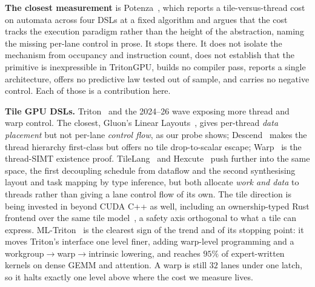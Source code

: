 \documentclass[sigplan,review,nonacm,10pt]{acmart}
\begin{document}
\textbf{The closest measurement} is Potenza~\cite{twofaces2026}, which reports a
tile-versus-thread cost on automata across four DSLs at a fixed algorithm and argues that
the cost tracks the execution paradigm rather than the height of the abstraction, naming
the missing per-lane control in prose. It stops there. It does not isolate the mechanism
from occupancy and instruction count, does not establish that the primitive is
inexpressible in TritonGPU, builds no compiler pass, reports a single architecture, offers
no predictive law tested out of sample, and carries no negative control. Each of those is a
contribution here.

\textbf{Tile GPU DSLs.} Triton~\cite{triton2019} and the 2024--26 wave exposing more
thread and warp control. The closest, Gluon's Linear Layouts~\cite{linearlayouts2025},
gives per-thread \emph{data placement} but not per-lane \emph{control flow}, as our probe
shows; Descend~\cite{descend2024} makes the thread hierarchy first-class but offers no tile
drop-to-scalar escape; Warp~\cite{warp2022} is the thread-SIMT existence proof. TileLang~\cite{tilelang2025} and Hexcute~\cite{hexcute2025} push further into the same
space, the first decoupling schedule from dataflow and the second synthesising layout and
task mapping by type inference, but both allocate \emph{work and data} to threads rather
than giving a lane control flow of its own. The tile direction is being invested in beyond
CUDA C++ as well, including an ownership-typed Rust frontend over the same tile
model~\cite{fearless2026}, a safety axis orthogonal to what a tile can express.
ML-Triton~\cite{mltriton2025} is the clearest sign of the trend and of its stopping point:
it moves Triton's interface one level finer, adding warp-level programming and a
workgroup$\rightarrow$warp$\rightarrow$intrinsic lowering, and reaches $95\%$ of
expert-written kernels on dense GEMM and attention. A warp is still $32$ lanes under one
latch, so it halts exactly one level above where the cost we measure lives.
\end{document}
